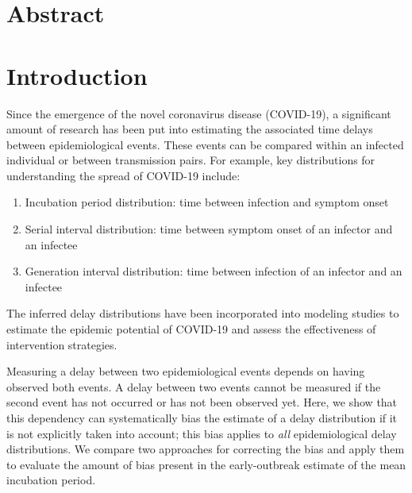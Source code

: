 \documentclass[12pt]{article}
\date{\today}
\begin{document}
\begin{flushleft}{
	\Large
	\textbf{}
}
\end{flushleft}

\section*{Abstract}

\pagebreak

\section{Introduction}

Since the emergence of the novel coronavirus disease (COVID-19), a significant amount of research has been put into estimating the associated time delays between epidemiological events.
These events can be compared within an infected individual or between transmission pairs.
For example, key distributions for understanding the spread of COVID-19 include:
\begin{enumerate}
  \item Incubation period distribution: time between infection and symptom onset \citep{backer2020incubation, li2020early, linton2020incubation, tian2020characteristics}
  \item Serial interval distribution: time between symptom onset of an infector and an infectee \citep{du2020serial, nishiura2020serial, zhao2020estimating}
  \item Generation interval distribution: time between infection of an infector and an infectee \citep{ganyani2020estimating}
\end{enumerate}
The inferred delay distributions have been incorporated into modeling studies to estimate the epidemic potential of COVID-19 and assess the effectiveness of intervention strategies.

Measuring a delay between two epidemiological events depends on having observed both events.
A delay between two events cannot be measured if the second event has not occurred or has not been observed yet.
Here, we show that this dependency can systematically bias the estimate of a delay distribution if it is not explicitly taken into account;
this bias applies to \emph{all} epidemiological delay distributions.
We compare two approaches for correcting the bias and apply them to evaluate the amount of bias present in the early-outbreak estimate of the mean incubation period.
\end{document}
